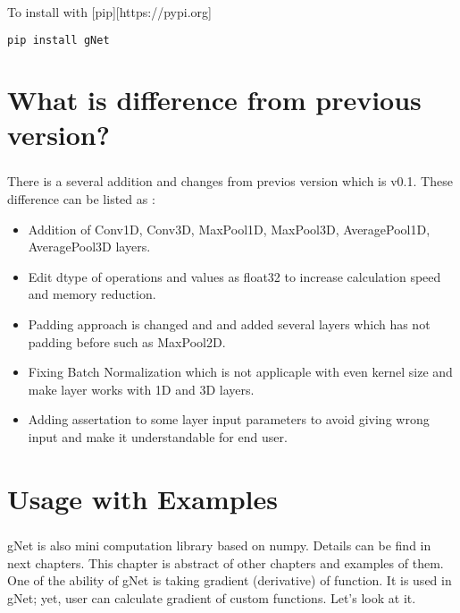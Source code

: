 \documentclass[12pt]{report}
\begin{document}
To install with [pip][https://pypi.org]
\begin{lstlisting}[language=bash, numbers=none, caption={Install with pip}, label={ex:install}]
pip install gNet
\end{lstlisting}



\chapter{What is difference from previous version?}

\paragraph{}
There is a several addition and changes from previos version which is v0.1. These difference can be listed as :

\begin{itemize}
	\item Addition of Conv1D, Conv3D, MaxPool1D, MaxPool3D, AveragePool1D, AveragePool3D layers.
	\item Edit dtype of operations and values as float32 to increase calculation speed and memory reduction. 
	\item Padding approach is changed and and added several layers which has not padding before such as MaxPool2D.
	\item Fixing Batch Normalization which is not applicaple with even kernel size and make layer works with 1D and 3D layers. 
	\item Adding assertation to some layer input parameters to avoid giving wrong input and make it understandable for end user.
\end{itemize}



\chapter{Usage with Examples}

\paragraph{}
gNet is also mini computation library based on numpy. Details can be find in next chapters. This chapter is abstract of other chapters and examples of them. One of the ability of gNet is taking gradient (derivative) of function. It is used in gNet; yet, user can calculate gradient of custom functions. Let's look at it.
\end{document}
